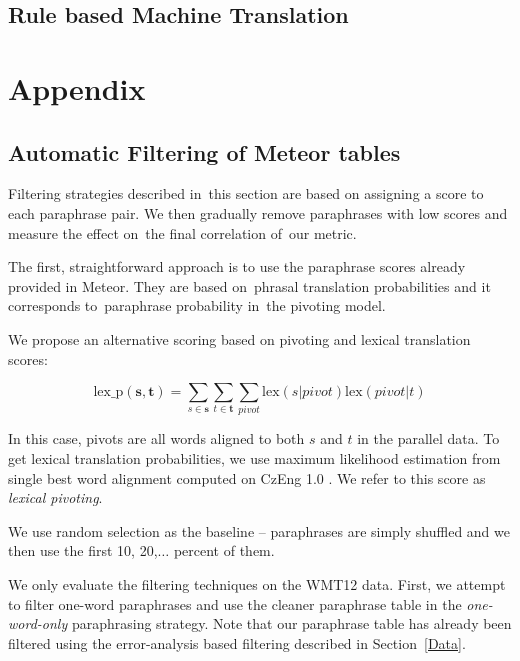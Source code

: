 \documentclass[11pt]{article}
\def\Sref#1{Section~\ref{#1}}
\begin{document}
\subsection{Rule based Machine Translation}






\section*{Appendix}
\subsection*{Automatic Filtering of Meteor tables}
\label{multiword_filtering}
Filtering strategies described in~this section are based on assigning a score 
to each paraphrase pair. We then gradually remove paraphrases with low scores 
and measure the effect on~the final correlation of~our metric.

The first, straightforward approach is to use the paraphrase scores already
provided in Meteor. They are based on~phrasal translation probabilities and it 
corresponds to~paraphrase probability in~the pivoting model.

We propose an alternative scoring based on pivoting and lexical translation
scores:

$$\text{lex\_p}(\mathbf{s},\mathbf{t}) = \sum_{s \in \mathbf{s}}\sum_{t \in
\mathbf{t}}\sum_{pivot}\text{lex}(s|pivot)\text{lex}(pivot|t)$$

In this case, pivots are all words aligned to both $s$ and $t$ in the parallel
data. To get lexical translation probabilities, we use maximum likelihood
estimation from single best word alignment computed on CzEng 1.0
\cite{czeng10:lrec2012}. We refer to this score as \emph{lexical pivoting}.

We use random selection as the baseline -- paraphrases are simply shuffled and 
we then use the first 10, 20,$\ldots$ percent of them.

We only evaluate the filtering techniques on the WMT12 data. First, we attempt
to filter one-word paraphrases and use the cleaner paraphrase table in the
\emph{one-word-only} paraphrasing strategy. Note that our paraphrase table has
already been filtered using the error-analysis based filtering described in 
\Sref{Data}.
\end{document}
